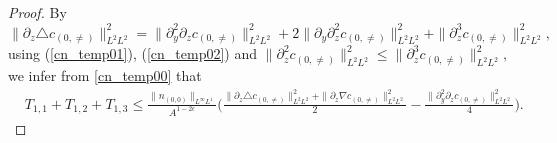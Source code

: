 \documentclass[10pt,a4paper]{amsart}
\begin{document}
\begin{proof}
		By $\|\partial_z\triangle c_{(0,\neq)}\|_{L^2L^2}^2=
		\|\partial_y^2\partial_z c_{(0,\neq)}\|_{L^2L^2}^2
		+2\|\partial_y\partial_z^2 c_{(0,\neq)}\|_{L^2L^2}^2
		+\|\partial_z^3 c_{(0,\neq)}\|_{L^2L^2}^2,$
		using (\ref{cn_temp01}), (\ref{cn_temp02}) and  
		$\|\partial_z^2c_{(0,\neq)}\|_{L^2L^2}^2
		\leq \|\partial_z^3c_{(0,\neq)}\|_{L^2L^2}^2,$
		we infer from \eqref{cn_temp00} that 
		\begin{equation*}
			\begin{aligned}
				&T_{1,1}+T_{1,2}+T_{1,3}\leq \frac{\|n_{(0,0)}\|_{L^\infty 	L^1}}{A^{1-2\epsilon}}
				\Big(\frac{\|\partial_z\triangle c_{(0,\neq)}\|_{L^2L^2}^2
					+\|\partial_z\nabla c_{(0,\neq)}\|_{L^2L^2}^2
				}{2}-\frac{\|\partial_y^2\partial_z c_{(0,\neq)}
					\|_{L^2L^2}^2}{4}\Big).
			\end{aligned}
		\end{equation*}
		

\end{proof}
\end{document}

